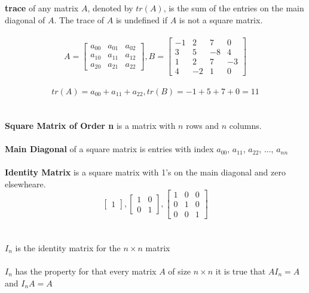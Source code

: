 \documentclass[a4paper, 12pt]{article}
\begin{document}
\\
\\
\textbf{trace} of any matrix $A$, denoted by $tr(A)$, is the sum of the entries on the main diagonal
of $A$. The trace of $A$ is undefined if $A$ is not a square matrix.
\\
\\
\[
A = \left[{
    \begin{array}{ccc}
    a_{00} & a_{01} & a_{02} \\
    a_{10} & a_{11} & a_{12} \\
    a_{20} & a_{21} & a_{22}
    \end{array}
}
\right]
,
B = \left[{
    \begin{array}{cccc}
    -1 &  2 &  7 &  0 \\
    3  &  5 & -8 &  4 \\
    1  &  2 &  7 & -3 \\
    4  & -2 &  1 &  0
    \end{array} 
}\right]
\]
\\
\[
tr(A) = a_{00} + a_{11} + a_{22}, 
tr(B) = -1 + 5 + 7 + 0 = 11
\]
\\
\\
\textbf{Square Matrix of Order n} is a matrix with $n$ rows and $n$ columns.
\\
\\
\textbf{Main Diagonal} of a square matrix is entries with index 
$a_{00}$, $a_{11}$, $a_{22}$, ..., $a_{nn}$
\\
\\
\textbf{Identity Matrix} is a square matrix with 1's on the main 
diagonal and zero elsewheare.
\[
\left[{
\begin{array}{c}
1
\end{array}
} \right]
,
\left[{
\begin{array}{cc}
1 & 0 \\
0 & 1 
\end{array}
} \right]
,
\left[{
\begin{array}{ccc}
1 & 0 & 0\\
0 & 1 & 0\\
0 & 0 & 1
\end{array}
} \right]
\] 
\\
\\
\textbf{$I_n$} is the identity matrix for the $n \times n$ matrix
\\
\\
$I_n$ has the property for that every matrix $A$ of size $n \times n$ 
it is true that $A I_n = A$  and $I_n A = A$
\\
\end{document}
